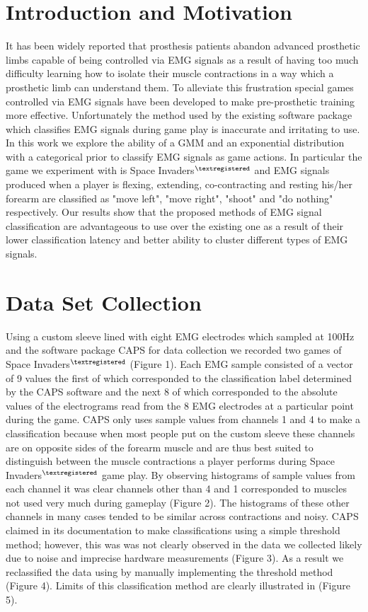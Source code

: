 \documentclass[times, 10pt,twocolumn]{article}
\begin{document}
\section{Introduction and Motivation}
It has been widely reported that prosthesis patients abandon advanced prosthetic limbs capable of being controlled
via EMG signals as a result of having too much difficulty learning how to isolate their muscle contractions in 
a way which a prosthetic limb can understand them. To alleviate this frustration special games
controlled via EMG signals have been developed to make pre-prosthetic training more effective. Unfortunately
the method used by the existing software package which classifies EMG signals during game play is inaccurate 
and irritating to use. In this work we explore the ability of a GMM and an exponential distribution with a
categorical prior to classify EMG signals as game actions. In particular the game we experiment with is Space
Invaders$^{\tiny{\textregistered}}$ and EMG signals produced when a player is flexing, extending, co-contracting and
resting his/her forearm are classified as "move left", "move right", "shoot" and "do nothing" respectively. Our
results show that the proposed methods of EMG signal classification are advantageous to use over the existing one
as a result of their lower classification latency and better ability to cluster different types of EMG signals.

\section{Data Set Collection}
Using a custom sleeve lined with eight EMG electrodes which sampled at 100Hz and the software package
CAPS for data collection we recorded two games of Space Invaders$^{\tiny{\textregistered}}$ (Figure 1). Each EMG sample 
consisted of a vector of 9 values the first of which corresponded to the classification label determined by the
CAPS software and the next 8 of which corresponded to the absolute values of the electrograms read from
the 8 EMG electrodes at a particular point during the game. CAPS only uses sample values from channels
1 and 4 to make a classification because when most people put on the custom sleeve these channels are
on opposite sides of the forearm muscle and are thus best suited to distinguish between the muscle contractions
a player performs during Space Invaders$^{\tiny{\textregistered}}$ game play. By observing histograms of sample values from each
channel it was clear channels other than 4 and 1 corresponded to muscles not used very much during gameplay (Figure 2).
The histograms of these other channels in many cases tended to be similar across contractions and noisy. 
CAPS claimed in its documentation to make classifications using a simple threshold method; however, this was
was not clearly observed in the data we collected likely due to noise and imprecise hardware measurements
(Figure 3). As a result we reclassified the data using by manually implementing the threshold method (Figure 4).
Limits of this classification method are clearly illustrated in (Figure 5). 
\end{document}
